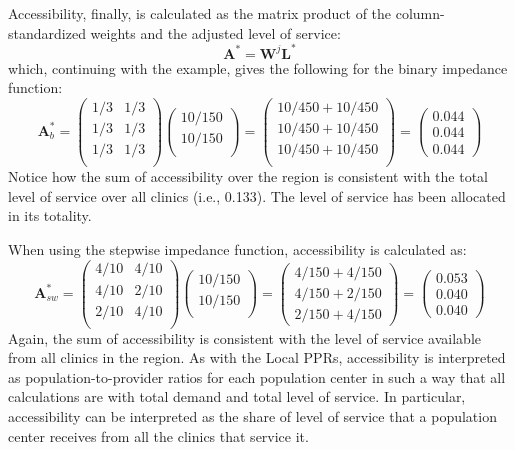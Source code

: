 \documentclass[10pt,letterpaper]{article}
\begin{document}
Accessibility, finally, is calculated as the matrix product of the
column-standardized weights and the adjusted level of service: \[
\mathbf{A}^*=\mathbf{W}^{j}\mathbf{L}^*
\] which, continuing with the example, gives the following for the
binary impedance function: \[
\mathbf{A}^*_{b} = 
\left(\begin{array}{ccc}
1/3 & 1/3\\
1/3 & 1/3\\
1/3 & 1/3\\
        \end{array}
        \right)
\left( \begin{array}{c}
10/150\\
10/150\\
\end{array} \right) =
\left( \begin{array}{c}
10/450 + 10/450\\
10/450 + 10/450\\
10/450 + 10/450\\
\end{array} \right)=
\left( \begin{array}{c}
0.044\\
0.044\\
0.044
\end{array} \right)
\] Notice how the sum of accessibility over the region is consistent
with the total level of service over all clinics (i.e., 0.133). The
level of service has been allocated in its totality.

When using the stepwise impedance function, accessibility is calculated
as: \[
\mathbf{A}^*_{sw} = 
\left(\begin{array}{ccc}
4/10 & 4/10\\
4/10 & 2/10\\
2/10 & 4/10\\
\end{array} \right)
\left( \begin{array}{c}
10/150\\
10/150\\
\end{array} \right) =
\left( \begin{array}{c}
4/150 + 4/150\\
4/150 + 2/150\\
2/150 + 4/150
\end{array} \right)=
\left( \begin{array}{c}
0.053\\
0.040\\
0.040
\end{array} \right)
\] Again, the sum of accessibility is consistent with the level of
service available from all clinics in the region. As with the Local
PPRs, accessibility is interpreted as population-to-provider ratios for
each population center in such a way that all calculations are with
total demand and total level of service. In particular, accessibility
can be interpreted as the share of level of service that a population
center receives from all the clinics that service it.
\end{document}
